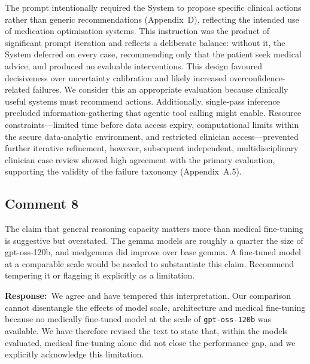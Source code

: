 \documentclass[11pt,a4paper]{article}
\newcounter{rcomment}
\newcommand{\response}{\noindent\textbf{Response:}\ }
\begin{document}
\begin{manuscriptchange}
The prompt intentionally required the System to propose specific clinical actions rather than generic recommendations (Appendix~D), reflecting the intended use of medication optimisation systems. This instruction was the product of significant prompt iteration and reflects a deliberate balance: without it, the System deferred on every case, recommending only that the patient seek medical advice, and produced no evaluable interventions. This design favoured decisiveness over uncertainty calibration and likely increased overconfidence-related failures. We consider this an appropriate evaluation because clinically useful systems must recommend actions. Additionally, single-pass inference precluded information-gathering that agentic tool calling might enable. Resource constraints---limited time before data access expiry, computational limits within the secure data-analytic environment, and restricted clinician access---prevented further iterative refinement, however, subsequent independent, multidisciplinary clinician case review showed high agreement with the primary evaluation, supporting the validity of the failure taxonomy (Appendix~A.5).
\end{manuscriptchange}

\subsection*{Comment 8}
\begin{reviewercomment}
The claim that general reasoning capacity matters more than medical fine-tuning is suggestive but overstated. The gemma models are roughly a quarter the size of gpt-oss-120b, and medgemma did improve over base gemma. A fine-tuned model at a comparable scale would be needed to substantiate this claim. Recommend tempering it or flagging it explicitly as a limitation.
\end{reviewercomment}

\response We agree and have tempered this interpretation. Our comparison cannot disentangle the effects of model scale, architecture and medical fine-tuning because no medically fine-tuned model at the scale of \texttt{gpt-oss-120b} was available. We have therefore revised the text to state that, within the models evaluated, medical fine-tuning alone did not close the performance gap, and we explicitly acknowledge this limitation.
\end{document}
